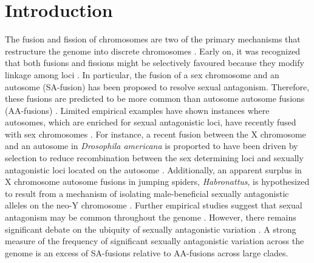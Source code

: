 \documentclass[12pt]{article}
\begin{document}
\section{Introduction}
The fusion and fission of chromosomes are two of the primary mechanisms that restructure the genome into discrete chromosomes \citep{blackmon2019}.
Early on, it was recognized that both fusions and fissions might be selectively favoured because they modify linkage among loci \citep{white1977,stebbins1971}.
In particular, the fusion of a sex chromosome and an autosome (SA-fusion) has been proposed to resolve sexual antagonism. Therefore, these fusions are predicted to be more common than autosome autosome fusions (AA-fusions) \citep{charlesworth1980}.
Limited empirical examples have shown instances where autosomes, which are enriched for sexual antagonistic loci, have recently fused with sex chromosomes \citep{zhou2012}.
For instance, a recent fusion between the X chromosome and an autosome in \textit{Drosophila americana} is proported to have been driven by selection to reduce recombination between the sex determining loci and sexually antagonistic loci located on the autosome \citep{mcallister2003}.
Additionally, an apparent surplus in X chromosome autosome fusions in jumping spiders, \textit{Habronattus}, is hypothesized to result from a mechanism of isolating male-beneficial sexually antagonistic alleles on the neo-Y chromosome \citep{maddison2013}.
Further empirical studies suggest that sexual antagonism may be common throughout the genome \citep{innocenti2010sexually,cheng2016sex}.
However, there remains significant debate on the ubiquity of sexually antagonistic variation \citep{kasimatis2019limits,ponnikas2018sex}.
A strong measure of the frequency of significant sexually antagonistic variation across the genome is an excess of SA-fusions relative to AA-fusions across large clades.

\end{document}
